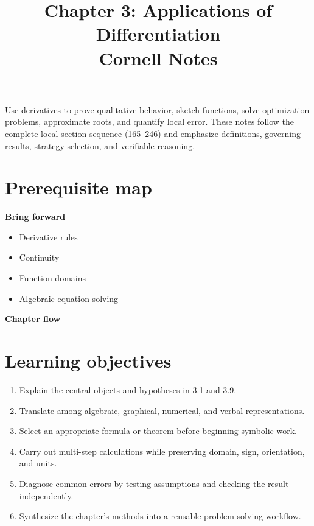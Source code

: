 \documentclass[11pt]{article}
\title{Chapter 3: Applications of Differentiation\\[2mm]\large Cornell Notes}
\author{}
\date{}
\begin{document}
\maketitle
\thispagestyle{fancy}
\begin{orientationbox}
Use derivatives to prove qualitative behavior, sketch functions, solve optimization problems, approximate roots, and quantify local error. These notes follow the complete local section sequence (165--246) and emphasize definitions, governing results, strategy selection, and verifiable reasoning.
\end{orientationbox}

\section{Prerequisite map}
\begin{minipage}[t]{0.42\textwidth}
\textbf{Bring forward}
\begin{itemize}
\item Derivative rules
\item Continuity
\item Function domains
\item Algebraic equation solving
\end{itemize}
\end{minipage}\hfill
\begin{minipage}[t]{0.54\textwidth}
\textbf{Chapter flow}
\begin{center}
\end{center}
\end{minipage}

\section{Learning objectives}
\begin{enumerate}
\item Explain the central objects and hypotheses in 3.1 and 3.9.
\item Translate among algebraic, graphical, numerical, and verbal representations.
\item Select an appropriate formula or theorem before beginning symbolic work.
\item Carry out multi-step calculations while preserving domain, sign, orientation, and units.
\item Diagnose common errors by testing assumptions and checking the result independently.
\item Synthesize the chapter's methods into a reusable problem-solving workflow.
\end{enumerate}
\end{document}
